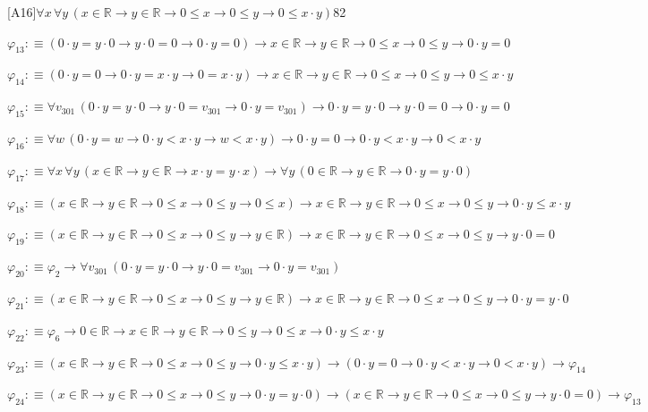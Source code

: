\begin{fullproof}{[A16]}{$\forall x\,\forall y\,(x \in \mathbb{R} \to y \in \mathbb{R} \to 0 \leq x \to 0 \leq y \to 0 \leq x \cdot y)$}{82}
\begin{abbrevlist}
\item $\varphi_{13} :\equiv (0 \cdot y = y \cdot 0 \to y \cdot 0 = 0 \to 0 \cdot y = 0) \to x \in \mathbb{R} \to y \in \mathbb{R} \to 0 \leq x \to 0 \leq y \to 0 \cdot y = 0$
\item $\varphi_{14} :\equiv (0 \cdot y = 0 \to 0 \cdot y = x \cdot y \to 0 = x \cdot y) \to x \in \mathbb{R} \to y \in \mathbb{R} \to 0 \leq x \to 0 \leq y \to 0 \leq x \cdot y$
\item $\varphi_{15} :\equiv \forall v_{301}\,(0 \cdot y = y \cdot 0 \to y \cdot 0 = v_{301} \to 0 \cdot y = v_{301}) \to 0 \cdot y = y \cdot 0 \to y \cdot 0 = 0 \to 0 \cdot y = 0$
\item $\varphi_{16} :\equiv \forall w\,(0 \cdot y = w \to 0 \cdot y < x \cdot y \to w < x \cdot y) \to 0 \cdot y = 0 \to 0 \cdot y < x \cdot y \to 0 < x \cdot y$
\item $\varphi_{17} :\equiv \forall x\,\forall y\,(x \in \mathbb{R} \to y \in \mathbb{R} \to x \cdot y = y \cdot x) \to \forall y\,(0 \in \mathbb{R} \to y \in \mathbb{R} \to 0 \cdot y = y \cdot 0)$
\item $\varphi_{18} :\equiv (x \in \mathbb{R} \to y \in \mathbb{R} \to 0 \leq x \to 0 \leq y \to 0 \leq x) \to x \in \mathbb{R} \to y \in \mathbb{R} \to 0 \leq x \to 0 \leq y \to 0 \cdot y \leq x \cdot y$
\item $\varphi_{19} :\equiv (x \in \mathbb{R} \to y \in \mathbb{R} \to 0 \leq x \to 0 \leq y \to y \in \mathbb{R}) \to x \in \mathbb{R} \to y \in \mathbb{R} \to 0 \leq x \to 0 \leq y \to y \cdot 0 = 0$
\item $\varphi_{20} :\equiv \varphi_{2} \to \forall v_{301}\,(0 \cdot y = y \cdot 0 \to y \cdot 0 = v_{301} \to 0 \cdot y = v_{301})$
\item $\varphi_{21} :\equiv (x \in \mathbb{R} \to y \in \mathbb{R} \to 0 \leq x \to 0 \leq y \to y \in \mathbb{R}) \to x \in \mathbb{R} \to y \in \mathbb{R} \to 0 \leq x \to 0 \leq y \to 0 \cdot y = y \cdot 0$
\item $\varphi_{22} :\equiv \varphi_{6} \to 0 \in \mathbb{R} \to x \in \mathbb{R} \to y \in \mathbb{R} \to 0 \leq y \to 0 \leq x \to 0 \cdot y \leq x \cdot y$
\item $\varphi_{23} :\equiv (x \in \mathbb{R} \to y \in \mathbb{R} \to 0 \leq x \to 0 \leq y \to 0 \cdot y \leq x \cdot y) \to (0 \cdot y = 0 \to 0 \cdot y < x \cdot y \to 0 < x \cdot y) \to \varphi_{14}$
\item $\varphi_{24} :\equiv (x \in \mathbb{R} \to y \in \mathbb{R} \to 0 \leq x \to 0 \leq y \to 0 \cdot y = y \cdot 0) \to (x \in \mathbb{R} \to y \in \mathbb{R} \to 0 \leq x \to 0 \leq y \to y \cdot 0 = 0) \to \varphi_{13}$

\end{abbrevlist}
\end{fullproof}

